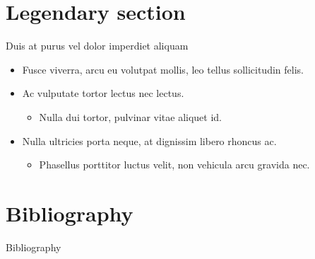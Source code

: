\documentclass{beamer} %
\begin{document}
  \section{Legendary section}
  

  \begin{frame}{Duis at purus vel dolor imperdiet aliquam}
    \begin{itemize}
      \item<1-2> Fusce viverra, arcu eu volutpat mollis, leo tellus sollicitudin felis.
      \item<2-5> Ac vulputate tortor lectus nec lectus.
      \begin{itemize}
	\item<3>  Nulla dui tortor, pulvinar vitae aliquet id.
      \end{itemize}
      \item<4-5> Nulla ultricies porta neque, at dignissim libero rhoncus ac.
      \begin{itemize}
	\item<5-> Phasellus porttitor luctus velit, non vehicula arcu gravida nec.
      \end{itemize}
    \end{itemize}
  \end{frame}

\section*{Bibliography}
  \begin{frame}[allowframebreaks]{Bibliography}
    \beamertemplatearticlebibitems
    
    
  \end{frame}

\end{document}
